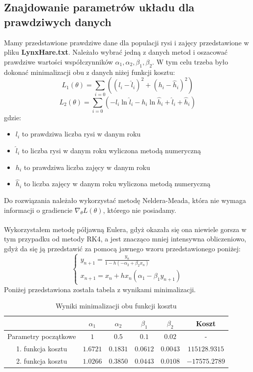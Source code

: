 \documentclass{article}
\begin{document}
\subsection{Znajdowanie parametrów układu dla prawdziwych danych}
Mamy przedstawione prawdziwe dane dla populacji rysi i zajęcy przedstawione w pliku \textbf{LynxHare.txt}. Należało wybrać jedną z danych metod i oszacować prawdziwe wartości współczynników $\alpha_1, \alpha_2, \beta_1, \beta_2$. W tym celu trzeba było dokonać minimalizacji obu z danych niżej funkcji kosztu:
$$L_1(\theta) = \sum_{i=0}((l_i-\hat{l}_i)^2 + (h_i-\hat{h}_i)^2)$$
$$L_2(\theta) = \sum_{i=0}(-l_i\ln\hat{l}_i - h_i\ln\hat{h}_i + \hat{l}_i + \hat{h}_i)$$
gdzie:
\begin{itemize}
\item $l_i$ to prawdziwa liczba rysi w danym roku
\item $\hat{l}_i$ to liczba rysi w danym roku wyliczona metodą numeryczną
\item $h_i$ to prawdziwa liczba zajęcy w danym roku
\item $\hat{h}_i$ to liczba zajęcy w danym roku wyliczona metodą numeryczną
\end{itemize}
Do rozwiązania należało wykorzystać metodę Neldera-Meada, która nie wymaga informacji o gradiencie $\nabla_{\theta}L(\theta)$, którego nie posiadamy.
\\\\
Wykorzystałem metodę półjawną Eulera, gdyż okazała się ona niewiele gorsza w tym przypadku od metody RK4, a jest znacząco mniej intensywna obliczeniowo, gdyż da się ją przedstawić za pomocą jawnego wzoru przedstawionego poniżej:
\begin{equation}
    \begin{cases}
        y_{n+1} = \frac{y_n}{1 - h(-\alpha_2+\beta_2x_n)} \\
        x_{n+1} = x_n + hx_n(\alpha_1-\beta_1y_{n+1})
    \end{cases} \nonumber
\end{equation}
Poniżej przedstawiona została tabela z wynikami minimalizacji.
\begin{table}[h!]
    \centering
    \begin{tabular}{|c|c|c|c|c|c|}
        \hline
        & $\alpha_1$ & $\alpha_2$ & $\beta_1$ & $\beta_2$ & Koszt \\
        \hline
        Parametry początkowe & $1$ & $0.5$ & $0.1$ & $0.02$ & - \\
        1. funkcja kosztu & $1.6721$ & $0.1831$ & $0.0612$ & $0.0043$ & $115128.9315$ \\
        2. funkcja kosztu & $1.0266$ & $0.3850$ & $0.0443$ & $0.0108$ & $-17575.2789$ \\
        \hline
    \end{tabular}
    \caption{Wyniki minimalizacji obu funkcji kosztu}
    \label{table}
\end{table}
\end{document}
